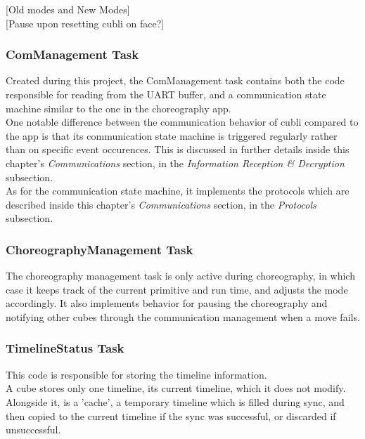 [Old modes and New Modes]\\

[Pause upon resetting cubli on face?]\\

\subsubsection{ComManagement Task}

Created during this project, the ComManagement task contains both the code responsible for reading from the UART buffer, and a communication state machine similar to the one in the choreography app.\\

One notable difference between the communication behavior of cubli compared to the app is that its communication state machine is triggered regularly rather than on specific event occurences. This is discussed in further details inside this chapter's \textit{Communications} section, in the \textit{Information Reception \& Decryption} subsection.\\ 

As for the communication state machine, it implements the protocols which are described inside this chapter's \textit{Communications} section, in the \textit{Protocols} subsection. 

\subsubsection{ChoreographyManagement Task}

The choreography management task is only active during choreography, in which case it keeps track of the current primitive and run time, and adjusts the mode accordingly. It also implements behavior for pausing the choreography and notifying other cubes through the communication management when a move fails.

\subsubsection{TimelineStatus Task}

This code is responsible for storing the timeline information.\\

A cube stores only one timeline, its current timeline, which it does not modify. Alongside it, is a 'cache', a temporary timeline which is filled during sync, and then copied to the current timeline if the sync was successful, or discarded if unsuccessful.\\

